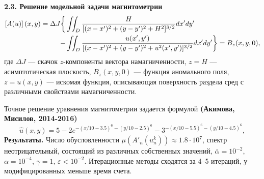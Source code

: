 \documentclass[10pt,pdf, mathserif, hyperref={unicode}]{beamer}
\begin{document}
\begin{frame}{\small\textbf{2.3. Решение модельной задачи магнитометрии}}
	\begin{equation*}\begin{aligned}
	\left[A(u)\right](x,y)=\Delta J  \bigg\{&\iint_{D} \frac{H}{[(x-x')^2+(y-y')^2+H^2]^{3/2}}dx'dy' \notag\\
	- &\iint_{D} \frac{u(x',y')}{[(x-x')^2+(y-y')^2+u^2(x',y')]^{3/2}}dx'dy' \bigg\}= B_z(x,y,0),
	\end{aligned} \end{equation*}
	где $\Delta J$ --- скачок $z$-компоненты вектора намагниченности, $z=H$ --- асимптотическая плоскость, $ B_z(x,y,0)$ --- функция аномального поля, $z=u(x,y)$ --- искомая функция, описывающая поверхность раздела сред с различными свойствами намагниченности.
	
	\smallskip
	Точное решение уравнения магнитометрии задается формулой \textbf{\color{red}(Акимова, Мисилов, 2014-2016)}
	$$\hat{u}(x,y)=5-2e^{-(x/10-3.5)^6-(y/10-2.5)^6}-3^{-(x/10-5.5)^6-(y/10-4.5)^6},$$
	\textbf{\color{blue}Результаты.} Число обусловленности $\mu(A'_n(u_n^k))\approx 1.8\cdot 10^7$, спектр неотрицательный, состоящий из различных собственных значений, $\bar\alpha=10^{-2}$, $\alpha = 10^{-4}$, $\gamma=1$, $\varepsilon < 10^{-2}$. Итерационные методы сходятся за 4--5 итераций, у модифицированных меньше время счета.
\end{frame}

%	
%		
\end{document}
